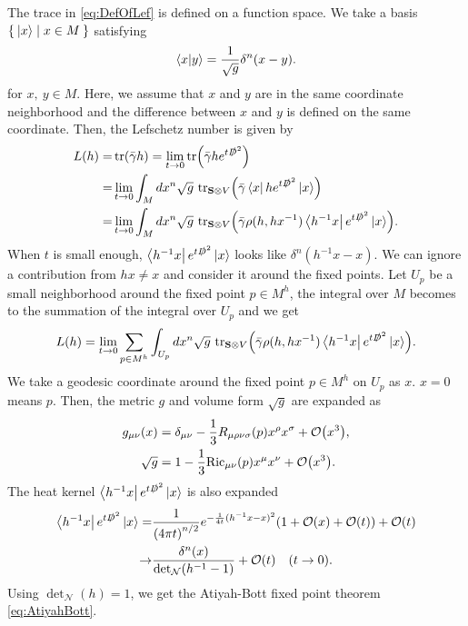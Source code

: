 \documentclass[11pt]{article}
\newcommand{\Lef}{Lefschetz }
\begin{document}
The trace in \eqref{eq:DefOfLef} is defined on a function space. We take a basis $\Set{ \ket{x} | x \in M}$ satisfying
\begin{align}
    \bra{x} \ket{y}=\frac{1}{\sqrt{g}} \delta^{n}(x-y).
\end{align}
for $x,~y \in M$. Here, we assume that $x$ and $y$ are in the same coordinate neighborhood and the difference between $x$ and $y$ is defined on the same coordinate. Then, the \Lef number is given by
\begin{align}
    L(h)=& \tr (\bar{\gamma} h)= \lim_{t\to 0} \tr (\bar{\gamma} h e^{t \slashed{D}^2}) \nonumber \\
    =&   \lim_{t\to 0} \int_M dx^{n} \sqrt{g} ~\text{tr}_{\mathbf{S} \otimes V} \qty(  \bar{\gamma}   \bra{x} h e^{t \slashed{D}^2} \ket{x}) \nonumber \\
    =&  \lim_{t\to 0} \int_M dx^n \sqrt{g} ~\text{tr}_{\mathbf{S} \otimes V} \qty(  \bar{\gamma}  \rho(h,hx^{-1}) \bra{h^{-1}x}  e^{t \slashed{D}^2} \ket{x}).
\end{align}
When $t$ is small enough, $\bra{h^{-1}x}  e^{t \slashed{D}^2} \ket{x}$ looks like $\delta^n(h^{-1}x-x)$. We can ignore a contribution from $hx\neq x$ and consider it around the fixed points. Let $U_p$ be a small neighborhood around the fixed point $p\in M^h$, the integral over $M$ becomes to the summation of the integral over $U_p$ and we get
\begin{align}
    L(h)= \lim_{t\to 0} \sum_{p\in M^h} \int_{U_p} dx^n \sqrt{g} ~\text{tr}_{\mathbf{S} \otimes V} \qty(  \bar{\gamma}  \rho(h,hx^{-1}) \bra{h^{-1}x}  e^{t \slashed{D}^2} \ket{x}).
\end{align}
We take a geodesic coordinate around the fixed point $p\in M^h$ on $U_p$ as $x$. $x=0$ means $p$. Then, the metric $g$ and volume form $\sqrt{g}$ are expanded as
\begin{align}
    g_{\mu \nu}(x)& = \delta_{\mu \nu }- \frac{1}{3} R_{\mu \rho \nu \sigma} (p) x^\rho x^\sigma +\order{x^3} , \\
    \sqrt{g} &= 1- \frac{1}{3}\text{Ric}_{\mu \nu} (p) x^\mu x^\nu +\order{x^3}.
\end{align}
The heat kernel $ \bra{h^{-1}x}  e^{t \slashed{D}^2} \ket{x}$ is also expanded
\begin{align}
     \bra{h^{-1}x}  e^{t \slashed{D}^2} \ket{x}=& \frac{1}{ \qty(4\pi t)^{n/2}}e^{-\frac{1}{4t} (h^{-1}x -x)^2} \qty( 1+ \order{x}+ \order{t} ) +\order{t} \nonumber \\
     \to & \frac{\delta^n( x)}{\det_\mathcal{N} (h^{-1} -1 )} +\order{t} \quad (t\to 0).
\end{align}
Using $\det_\mathcal{N}(h)=1$, we get the Atiyah-Bott fixed point theorem \eqref{eq:AtiyahBott}.
\end{document}
